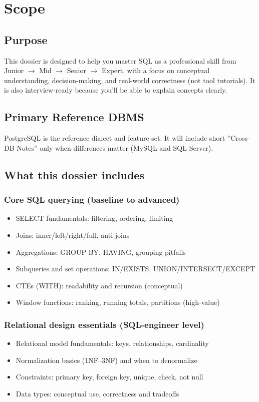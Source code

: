 \section{Scope}

\subsection{Purpose}
This dossier is designed to help you master SQL as a professional skill from Junior $\rightarrow$ Mid 
$\rightarrow$ Senior $\rightarrow$ Expert, with a focus on conceptual understanding, decision-making, 
and real-world correctness (not tool tutorials). It is also interview-ready because you'll be able 
to explain concepts clearly.

\subsection{Primary Reference DBMS}
PostgreSQL is the reference dialect and feature set. It will include short ''Cross-DB Notes'' 
only when differences matter (MySQL and SQL Server).

\subsection{What this dossier includes}
\subsubsection{Core SQL querying (baseline to advanced)}
\begin{itemize}
    \item SELECT fundamentals: filtering, ordering, limiting
    \item Joins: inner/left/right/full, anti-joins
    \item Aggregations: GROUP BY, HAVING, grouping pitfalls
    \item Subqueries and set operations: IN/EXISTS, UNION/INTERSECT/EXCEPT
    \item CTEs (WITH): readability and recursion (conceptual)
    \item Window functions: ranking, running totals, partitions (high-value)
\end{itemize}

\subsubsection{Relational design essentials (SQL-engineer level)}
\begin{itemize}
    \item Relational model fundamentals: keys, relationships, cardinality
    \item Normalization basics (1NF--3NF) and when to denormalize
    \item Constraints: primary key, foreign key, unique, check, not null
    \item Data types: conceptual use, correctness and tradeoffs
\end{itemize}


